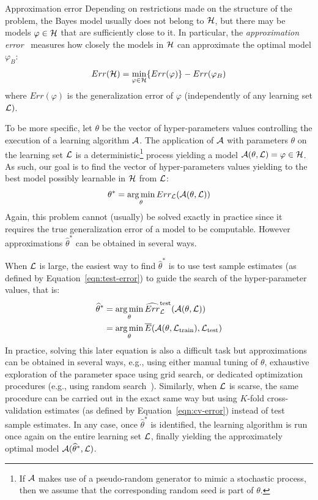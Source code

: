 \begin{remark}{Approximation error}
Depending on restrictions made on the structure of the problem, the
Bayes model usually does not belong to ${\cal H}$, but there may be models
$\varphi \in {\cal H}$ that are sufficiently close to it. In particular, the
\textit{approximation error}~\citep{bottou:2011} measures how closely the
models in ${\cal H}$ can approximate the optimal model $\varphi_B$:
\begin{equation}
Err({\cal H}) = \min_{\varphi \in {\cal H}} \{ Err(\varphi) \} - Err(\varphi_B)
\end{equation}
where $Err(\varphi)$ is the generalization error of $\varphi$ (independently
of any learning set ${\cal L})$.
\end{remark}

To be more specific, let $\theta$ be the vector of hyper-parameters values
controlling the execution of a learning algorithm ${\cal A}$. The application
of ${\cal A}$ with parameters $\theta$ on the learning set ${\cal L}$ is a
deterministic\footnote{If ${\cal A}$ makes use of a pseudo-random generator to
mimic a stochastic process, then we assume that the corresponding random seed is
part of $\theta$.} process yielding a model ${\cal A}(\theta, {\cal L}) =
\varphi \in {\cal H}$. As such, our goal is to find the vector of hyper-parameters values
yielding to the best model possibly learnable in ${\cal H}$ from ${\cal L}$:
\begin{equation}
\theta^* = \operatorname*{arg\,min}_{\theta} Err_{\cal L}({\cal A}(\theta, {\cal L}))
\end{equation}
Again, this problem cannot (usually) be solved exactly in practice since
it requires the true generalization error of a model to be computable. However
approximations $\widehat{\theta}^*$ can be obtained in several ways.

When ${\cal L}$ is large, the easiest way to find $\widehat{\theta}^*$ is to
use test sample estimates (as defined by Equation~\ref{eqn:test-error}) to
guide the search of the hyper-parameter values, that is:
\begin{align}
\widehat{\theta}^* &= \operatorname*{arg\,min}_{\theta} \widehat{Err}^\text{test}_{\cal L}({\cal A}(\theta, {\cal L})) \\
                   &= \operatorname*{arg\,min}_{\theta} \overline{E}({\cal A}(\theta, {\cal L}_\text{train}), {\cal L}_\text{test})
\end{align}
In practice, solving this later equation is also a difficult task but
approximations can be obtained in several ways, e.g., using either manual
tuning of $\theta$, exhaustive exploration of the parameter space using grid
search, or dedicated optimization procedures (e.g., using random
search~\citep{bergstra:2012}). Similarly, when ${\cal L}$ is scarse, the same
procedure can be carried out in the exact same way but using $K$-fold
cross-validation estimates (as defined by Equation~\ref{eqn:cv-error}) instead of test sample
estimates. In any case, once $\widehat{\theta}^*$ is identified, the learning
algorithm is run once again on the entire learning set ${\cal L}$, finally
yielding the approximately optimal model ${\cal A}(\widehat{\theta}^*, {\cal
L})$.

